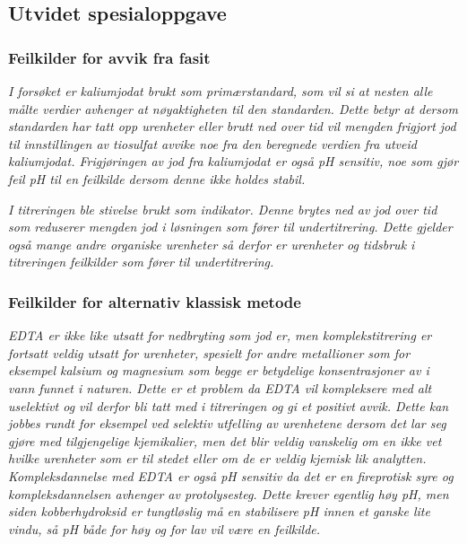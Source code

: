 

\subsection{Utvidet spesialoppgave}

\subsubsection{Feilkilder for avvik fra fasit}
\textit{I forsøket er kaliumjodat brukt som primærstandard, som vil si at nesten alle målte verdier avhenger at nøyaktigheten til den standarden. Dette betyr at dersom standarden har tatt opp urenheter eller brutt ned over tid vil mengden frigjort jod til innstillingen av tiosulfat avvike noe fra den beregnede verdien fra utveid kaliumjodat\cite{IodStandardFeil}. Frigjøringen av jod fra kaliumjodat er også pH sensitiv\cite{IodometriLiberation}, noe som gjør feil pH til en feilkilde dersom denne ikke holdes stabil.}

\textit{I titreringen ble stivelse brukt som indikator. Denne brytes ned av jod over tid\cite{IodometryStarch} som reduserer mengden jod i løsningen som fører til undertitrering. Dette gjelder også mange andre organiske urenheter så derfor er urenheter og tidsbruk i titreringen feilkilder som fører til undertitrering.}


\subsubsection{Feilkilder for alternativ klassisk metode}
\textit{EDTA er ikke like utsatt for nedbryting som jod er, men komplekstitrering er fortsatt veldig utsatt for urenheter, spesielt for andre metallioner som for eksempel kalsium og magnesium\cite{EDTACalcium}\cite{EDTACalcium2} som begge er betydelige konsentrasjoner av i vann funnet i naturen. Dette er et problem da EDTA vil kompleksere med alt uselektivt og vil derfor bli tatt med i titreringen og gi et positivt avvik. Dette kan jobbes rundt for eksempel ved selektiv utfelling av urenhetene dersom det lar seg gjøre med tilgjengelige kjemikalier, men det blir veldig vanskelig om en ikke vet hvilke urenheter som er til stedet eller om de er veldig kjemisk lik analytten. Kompleksdannelse med EDTA er også pH sensitiv da det er en fireprotisk syre og kompleksdannelsen avhenger av protolysesteg. Dette krever egentlig høy pH, men siden kobberhydroksid er tungtløslig må en stabilisere pH innen et ganske lite vindu, så pH både for høy og for lav vil være en feilkilde.}


